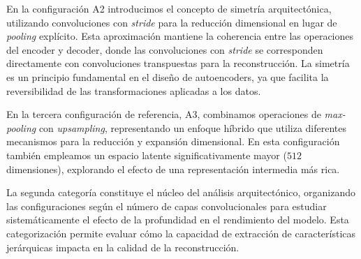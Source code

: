 En la configuración A2 introducimos el concepto de simetría arquitectónica, utilizando convoluciones con \emph{stride} para la reducción dimensional en lugar de \emph{pooling} explícito. Esta aproximación mantiene la coherencia entre las operaciones del encoder y decoder, donde las convoluciones con \emph{stride} se corresponden directamente con convoluciones transpuestas para la reconstrucción. La simetría es un principio fundamental en el diseño de autoencoders, ya que facilita la reversibilidad de las transformaciones aplicadas a los datos.

En la tercera configuración de referencia, A3, combinamos operaciones de \emph{max-pooling} con \emph{upsampling}, representando un enfoque híbrido que utiliza diferentes mecanismos para la reducción y expansión dimensional. En esta configuración también empleamos un espacio latente significativamente mayor ($512$ dimensiones), explorando el efecto de una representación intermedia más rica.


La segunda categoría constituye el núcleo del análisis arquitectónico, organizando las configuraciones según el número de capas convolucionales para estudiar sistemáticamente el efecto de la profundidad en el rendimiento del modelo. Esta categorización permite evaluar cómo la capacidad de extracción de características jerárquicas impacta en la calidad de la reconstrucción.

